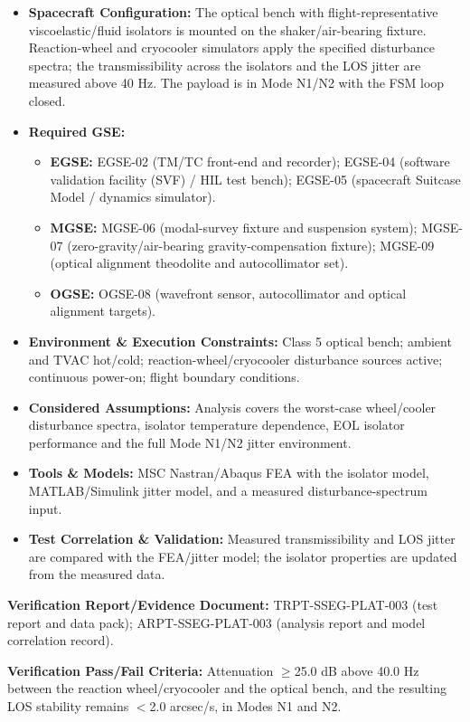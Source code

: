 \begin{itemize}
\item \textbf{Spacecraft Configuration:} The optical bench with flight-representative viscoelastic/fluid isolators is mounted on the shaker/air-bearing fixture. Reaction-wheel and cryocooler simulators apply the specified disturbance spectra; the transmissibility across the isolators and the LOS jitter are measured above 40 Hz. The payload is in Mode N1/N2 with the FSM loop closed.
\item \textbf{Required GSE:}
\begin{itemize}
\item \textbf{EGSE:} EGSE-02 (TM/TC front-end and recorder); EGSE-04 (software validation facility (SVF) / HIL test bench); EGSE-05 (spacecraft Suitcase Model / dynamics simulator).
\item \textbf{MGSE:} MGSE-06 (modal-survey fixture and suspension system); MGSE-07 (zero-gravity/air-bearing gravity-compensation fixture); MGSE-09 (optical alignment theodolite and autocollimator set).
\item \textbf{OGSE:} OGSE-08 (wavefront sensor, autocollimator and optical alignment targets).
\end{itemize}
\item \textbf{Environment \& Execution Constraints:} Class 5 optical bench; ambient and TVAC hot/cold; reaction-wheel/cryocooler disturbance sources active; continuous power-on; flight boundary conditions.
\item \textbf{Considered Assumptions:} Analysis covers the worst-case wheel/cooler disturbance spectra, isolator temperature dependence, EOL isolator performance and the full Mode N1/N2 jitter environment.
\item \textbf{Tools \& Models:} MSC Nastran/Abaqus FEA with the isolator model, MATLAB/Simulink jitter model, and a measured disturbance-spectrum input.
\item \textbf{Test Correlation \& Validation:} Measured transmissibility and LOS jitter are compared with the FEA/jitter model; the isolator properties are updated from the measured data.
\end{itemize}
\par\textbf{Verification Report/Evidence Document:} TRPT-SSEG-PLAT-003 (test report and data pack); ARPT-SSEG-PLAT-003 (analysis report and model correlation record).
\par\textbf{Verification Pass/Fail Criteria:} Attenuation $\ge$25.0 dB above 40.0 Hz between the reaction wheel/cryocooler and the optical bench, and the resulting LOS stability remains $<$2.0 arcsec/s, in Modes N1 and N2.
\par\medskip
